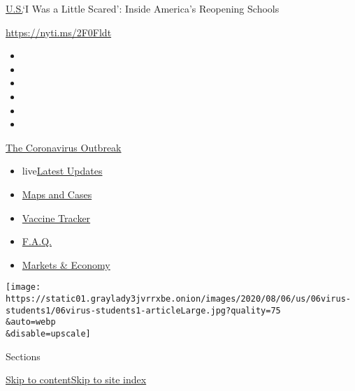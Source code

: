 \href{/section/us}{U.S.}\textbar{}`I Was a Little Scared': Inside
America's Reopening Schools

\url{https://nyti.ms/2F0Fldt}

\begin{itemize}
\item
\item
\item
\item
\item
\item
\end{itemize}

\href{https://www.nytimes3xbfgragh.onion/news-event/coronavirus?action=click\&pgtype=Article\&state=default\&region=TOP_BANNER\&context=storylines_menu}{The
Coronavirus Outbreak}

\begin{itemize}
\tightlist
\item
  live\href{https://www.nytimes3xbfgragh.onion/2020/08/07/world/covid-19-news.html?action=click\&pgtype=Article\&state=default\&region=TOP_BANNER\&context=storylines_menu}{Latest
  Updates}
\item
  \href{https://www.nytimes3xbfgragh.onion/interactive/2020/us/coronavirus-us-cases.html?action=click\&pgtype=Article\&state=default\&region=TOP_BANNER\&context=storylines_menu}{Maps
  and Cases}
\item
  \href{https://www.nytimes3xbfgragh.onion/interactive/2020/science/coronavirus-vaccine-tracker.html?action=click\&pgtype=Article\&state=default\&region=TOP_BANNER\&context=storylines_menu}{Vaccine
  Tracker}
\item
  \href{https://www.nytimes3xbfgragh.onion/interactive/2020/world/coronavirus-tips-advice.html?action=click\&pgtype=Article\&state=default\&region=TOP_BANNER\&context=storylines_menu}{F.A.Q.}
\item
  \href{https://www.nytimes3xbfgragh.onion/live/2020/08/07/business/stock-market-today-coronavirus?action=click\&pgtype=Article\&state=default\&region=TOP_BANNER\&context=storylines_menu}{Markets
  \& Economy}
\end{itemize}

\texttt{[image: https://static01.graylady3jvrrxbe.onion/images/2020/08/06/us/06virus-students1/06virus-students1-articleLarge.jpg?quality=75\\\&auto=webp\\\&disable=upscale]}

Sections

\protect\hyperlink{site-content}{Skip to
content}\protect\hyperlink{site-index}{Skip to site index}

